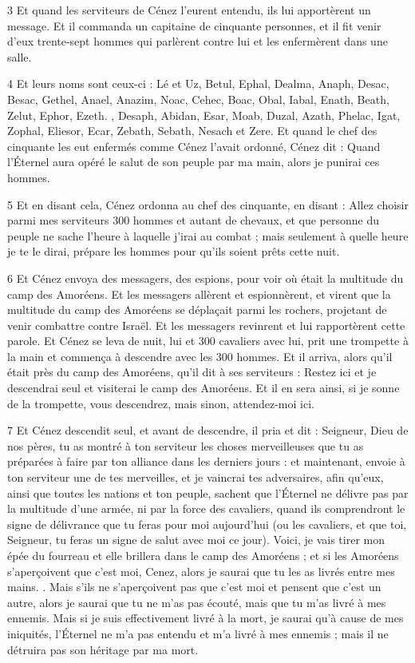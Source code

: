 \par 3 Et quand les serviteurs de Cénez l'eurent entendu, ils lui apportèrent un message. Et il commanda un capitaine de cinquante personnes, et il fit venir d'eux trente-sept hommes qui parlèrent contre lui et les enfermèrent dans une salle.

\par 4 Et leurs noms sont ceux-ci : Lé et Uz, Betul, Ephal, Dealma, Anaph, Desac, Besac, Gethel, Anael, Anazim, Noac, Cehec, Boac, Obal, Iabal, Enath, Beath, Zelut, Ephor, Ezeth. , Desaph, Abidan, Esar, Moab, Duzal, Azath, Phelac, Igat, Zophal, Eliesor, Ecar, Zebath, Sebath, Nesach et Zere. Et quand le chef des cinquante les eut enfermés comme Cénez l'avait ordonné, Cénez dit : Quand l'Éternel aura opéré le salut de son peuple par ma main, alors je punirai ces hommes.

\par 5 Et en disant cela, Cénez ordonna au chef des cinquante, en disant : Allez choisir parmi mes serviteurs 300 hommes et autant de chevaux, et que personne du peuple ne sache l'heure à laquelle j'irai au combat ; mais seulement à quelle heure je te le dirai, prépare les hommes pour qu'ils soient prêts cette nuit.

\par 6 Et Cénez envoya des messagers, des espions, pour voir où était la multitude du camp des Amoréens. Et les messagers allèrent et espionnèrent, et virent que la multitude du camp des Amoréens se déplaçait parmi les rochers, projetant de venir combattre contre Israël. Et les messagers revinrent et lui rapportèrent cette parole. Et Cénez se leva de nuit, lui et 300 cavaliers avec lui, prit une trompette à la main et commença à descendre avec les 300 hommes. Et il arriva, alors qu'il était près du camp des Amoréens, qu'il dit à ses serviteurs : Restez ici et je descendrai seul et visiterai le camp des Amoréens. Et il en sera ainsi, si je sonne de la trompette, vous descendrez, mais sinon, attendez-moi ici.

\par 7 Et Cénez descendit seul, et avant de descendre, il pria et dit : Seigneur, Dieu de nos pères, tu as montré à ton serviteur les choses merveilleuses que tu as préparées à faire par ton alliance dans les derniers jours : et maintenant, envoie à ton serviteur une de tes merveilles, et je vaincrai tes adversaires, afin qu'eux, ainsi que toutes les nations et ton peuple, sachent que l'Éternel ne délivre pas par la multitude d'une armée, ni par la force des cavaliers, quand ils comprendront le signe de délivrance que tu feras pour moi aujourd'hui (ou les cavaliers, et que toi, Seigneur, tu feras un signe de salut avec moi ce jour). Voici, je vais tirer mon épée du fourreau et elle brillera dans le camp des Amoréens ; et si les Amoréens s'aperçoivent que c'est moi, Cenez, alors je saurai que tu les as livrés entre mes mains. . Mais s’ils ne s’aperçoivent pas que c’est moi et pensent que c’est un autre, alors je saurai que tu ne m’as pas écouté, mais que tu m’as livré à mes ennemis. Mais si je suis effectivement livré à la mort, je saurai qu'à cause de mes iniquités, l'Éternel ne m'a pas entendu et m'a livré à mes ennemis ; mais il ne détruira pas son héritage par ma mort.

